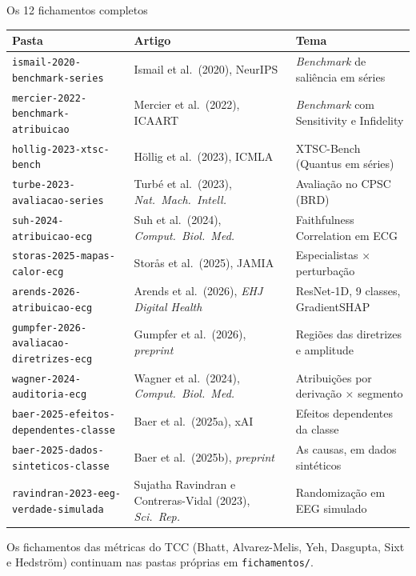 \documentclass[11pt,a4paper]{article}
\begin{document}
\begin{infobox}[note]{Os 12 fichamentos completos}
\begin{center}\small
\begin{tabularx}{\linewidth}{lXl}
\toprule
\textbf{Pasta} & \textbf{Artigo} & \textbf{Tema} \\
\midrule
\texttt{ismail-2020-benchmark-series} & Ismail et al.\ (2020), NeurIPS & \textit{Benchmark} de saliência em séries \\
\texttt{mercier-2022-benchmark-atribuicao} & Mercier et al.\ (2022), ICAART & \textit{Benchmark} com Sensitivity e Infidelity \\
\texttt{hollig-2023-xtsc-bench} & Höllig et al.\ (2023), ICMLA & XTSC-Bench (Quantus em séries) \\
\texttt{turbe-2023-avaliacao-series} & Turbé et al.\ (2023), \textit{Nat.\ Mach.\ Intell.} & Avaliação no CPSC (BRD) \\
\texttt{suh-2024-atribuicao-ecg} & Suh et al.\ (2024), \textit{Comput.\ Biol.\ Med.} & Faithfulness Correlation em ECG \\
\texttt{storas-2025-mapas-calor-ecg} & Storås et al.\ (2025), JAMIA & Especialistas × perturbação \\
\texttt{arends-2026-atribuicao-ecg} & Arends et al.\ (2026), \textit{EHJ Digital Health} & ResNet-1D, 9 classes, GradientSHAP \\
\texttt{gumpfer-2026-avaliacao-diretrizes-ecg} & Gumpfer et al.\ (2026), \textit{preprint} & Regiões das diretrizes e amplitude \\
\texttt{wagner-2024-auditoria-ecg} & Wagner et al.\ (2024), \textit{Comput.\ Biol.\ Med.} & Atribuições por derivação × segmento \\
\texttt{baer-2025-efeitos-dependentes-classe} & Baer et al.\ (2025a), xAI & Efeitos dependentes da classe \\
\texttt{baer-2025-dados-sinteticos-classe} & Baer et al.\ (2025b), \textit{preprint} & As causas, em dados sintéticos \\
\texttt{ravindran-2023-eeg-verdade-simulada} & Sujatha Ravindran e Contreras-Vidal (2023), \textit{Sci.\ Rep.} & Randomização em EEG simulado \\
\bottomrule
\end{tabularx}
\end{center}
Os fichamentos das métricas do TCC (Bhatt, Alvarez-Melis, Yeh, Dasgupta, Sixt e Hedström) continuam nas pastas próprias em \texttt{fichamentos/}.
\end{infobox}
\end{document}
